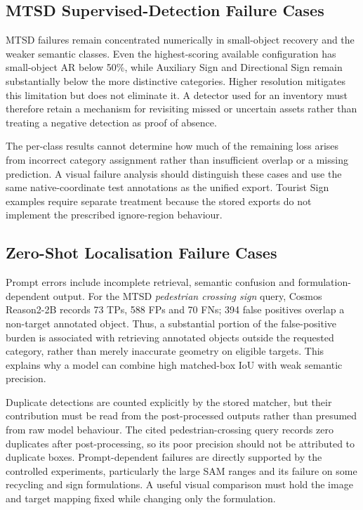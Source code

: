 \subsection{MTSD Supervised-Detection Failure Cases}
\label{sec:ev-mtsd-failures}
MTSD failures remain concentrated numerically in small-object recovery and the weaker semantic classes. Even the highest-scoring available configuration has small-object AR below 50\%, while Auxiliary Sign and Directional Sign remain substantially below the more distinctive categories. Higher resolution mitigates this limitation but does not eliminate it. A detector used for an inventory must therefore retain a mechanism for revisiting missed or uncertain assets rather than treating a negative detection as proof of absence.

The per-class results cannot determine how much of the remaining loss arises from incorrect category assignment rather than insufficient overlap or a missing prediction. A visual failure analysis should distinguish these cases and use the same native-coordinate test annotations as the unified export. Tourist Sign examples require separate treatment because the stored exports do not implement the prescribed ignore-region behaviour.


\subsection{Zero-Shot Localisation Failure Cases}
\label{sec:ev-prompt-failures}
Prompt errors include incomplete retrieval, semantic confusion and formulation-dependent output. For the MTSD \emph{pedestrian crossing sign} query, Cosmos Reason2-2B records 73 \glspl{TP}, 588 \glspl{FP} and 70 \glspl{FN}; 394 false positives overlap a non-target annotated object. Thus, a substantial portion of the false-positive burden is associated with retrieving annotated objects outside the requested category, rather than merely inaccurate geometry on eligible targets. This explains why a model can combine high matched-box \gls{IoU} with weak semantic precision.

Duplicate detections are counted explicitly by the stored matcher, but their contribution must be read from the post-processed outputs rather than presumed from raw model behaviour. The cited pedestrian-crossing query records zero duplicates after post-processing, so its poor precision should not be attributed to duplicate boxes. Prompt-dependent failures are directly supported by the controlled experiments, particularly the large SAM ranges and its failure on some recycling and sign formulations. A useful visual comparison must hold the image and target mapping fixed while changing only the formulation.

